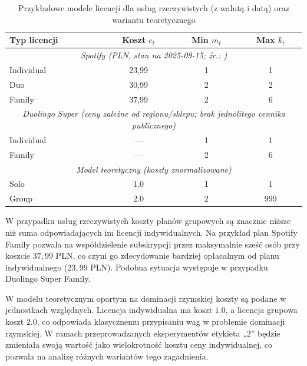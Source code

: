 \begin{table}[h!]
\centering
\caption{Przykładowe modele licencji dla usług rzeczywistych (z walutą i datą) oraz wariantu teoretycznego}
\label{tab:license_models_real}
\begin{tabular}{lccc}
\hline
\textbf{Typ licencji} & \textbf{Koszt $c_t$} & \textbf{Min $m_t$} & \textbf{Max $k_t$} \\
\hline
\multicolumn{4}{c}{\textit{Spotify (PLN, stan na 2025-09-15; źr.: \cite{spotify_pl_premium_2025})}} \\
Individual & 23{,}99 & 1 & 1 \\
Duo        & 30{,}99 & 2 & 2 \\
Family     & 37{,}99 & 2 & 6 \\
\hline
\multicolumn{4}{c}{\textit{Duolingo Super (ceny zależne od regionu/sklepu; brak jednolitego cennika publicznego\footnotemark)}} \\
Individual & — & 1 & 1 \\
Family     & — & 2 & 6 \\
\hline
\multicolumn{4}{c}{\textit{Model teoretyczny (koszty znormalizowane)}} \\
Solo       & 1.0   & 1 & 1 \\
Group      & 2.0   & 2 & 999 \\
\hline
\end{tabular}
\end{table}

W przypadku usług rzeczywistych koszty planów grupowych są znacznie niższe niż suma odpowiadających im licencji indywidualnych. Na przykład plan Spotify Family pozwala na współdzielenie subskrypcji przez maksymalnie sześć osób przy koszcie $37{,}99$ PLN, co czyni go zdecydowanie bardziej opłacalnym od planu indywidualnego ($23{,}99$ PLN). Podobna sytuacja występuje w przypadku Duolingo Super Family.

W modelu teoretycznym opartym na dominacji rzymskiej koszty są podane w jednostkach względnych. Licencja indywidualna ma koszt $1.0$, a licencja grupowa koszt $2.0$, co odpowiada klasycznemu przypisaniu wag w problemie dominacji rzymskiej. W ramach przeprowadzanych eksperymentów etykieta „2” będzie zmieniała swoją wartość jako wielokrotność kosztu ceny indywidualnej, co pozwala na analizę różnych wariantów tego zagadnienia.

